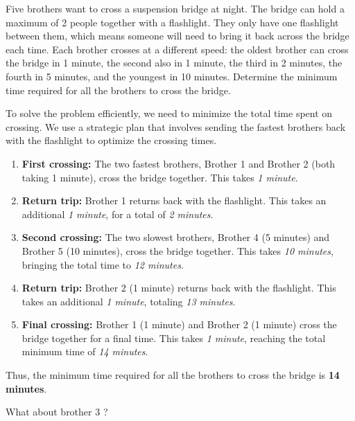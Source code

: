 \begin{airesult}
Five brothers want to cross a suspension bridge at night. The bridge
can hold a maximum of 2 people together with a flashlight. They only have one
flashlight between them, which means someone will need to bring it back across
the bridge each time. Each brother crosses at a different speed: the oldest
brother can cross the bridge in 1 minute, the second also in 1 minute, the third
in 2 minutes, the fourth in 5 minutes, and the youngest in 10 minutes. Determine
the minimum time required for all the brothers to cross the bridge.

\vsp

To solve the problem efficiently, we need to minimize the total time spent
on crossing. We use a strategic plan that involves sending the fastest brothers
back with the flashlight to optimize the crossing times.

\vsp

\begin{enumerate}
  \item \textbf{First crossing:} The two fastest brothers, Brother 1 and Brother
2 (both taking 1 minute), cross the bridge together. This takes \textit{1
minute}.
  \item \textbf{Return trip:} Brother 1 returns back with the flashlight. This
takes an additional \textit{1 minute}, for a total of \textit{2 minutes}.
  \item \textbf{Second crossing:} The two slowest brothers, Brother 4 (5
minutes) and Brother 5 (10 minutes), cross the bridge together. This takes
\textit{10 minutes}, bringing the total time to \textit{12 minutes}.
  \item \textbf{Return trip:} Brother 2 (1 minute) returns back with the
flashlight. This takes an additional \textit{1 minute}, totaling \textit{13
minutes}.
  \item \textbf{Final crossing:} Brother 1 (1 minute) and Brother 2 (1 minute)
cross the bridge together for a final time. This takes \textit{1 minute},
reaching the total minimum time of \textit{14 minutes}.
\end{enumerate}

\vsp

Thus, the minimum time required for all the brothers to cross the bridge is
\textbf{14 minutes}.
\end{airesult}

\begin{ai}
What about brother 3 ?
\end{ai}

